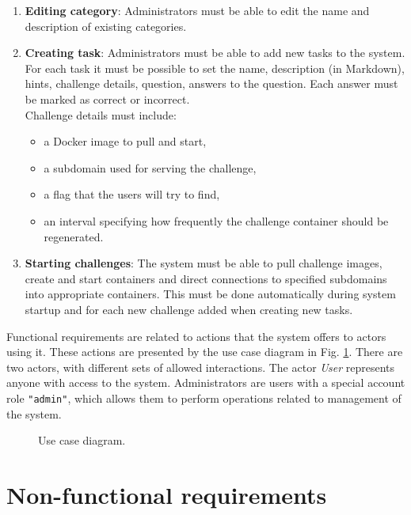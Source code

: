\begin{enumerate}
	\item \textbf{Editing category}: Administrators must be able to edit the name and description of existing categories.

	\item \textbf{Creating task}: Administrators must be able to add new tasks to the system. For each task it must be possible to set the name, description (in Markdown), hints, challenge details, question, answers to the question. Each answer must be marked as correct or incorrect.\\
	Challenge details must include:
	\begin{itemize}
		\item a Docker image to pull and start,
		\item a subdomain used for serving the challenge,
		\item a flag that the users will try to find,
		\item an interval specifying how frequently the challenge container should be regenerated.
	\end{itemize}

	\item \textbf{Starting challenges}: The system must be able to pull challenge images, create and start containers and direct connections to specified subdomains into appropriate containers. This must be done automatically during system startup and for each new challenge added when creating new tasks.
\end{enumerate}

Functional requirements are related to actions that the system offers to actors using it. These actions are presented by the use case diagram in Fig. \ref{fig:use-case-diag}. There are two actors, with different sets of allowed interactions. The actor \textit{User} represents anyone with access to the system. Administrators are users with a special account role \texttt{"admin"}, which allows them to perform operations related to management of the system.

\begin{figure}
	\centering
	
	\caption{Use case diagram.}
	\label{fig:use-case-diag}
\end{figure}

\section{Non-functional requirements}

